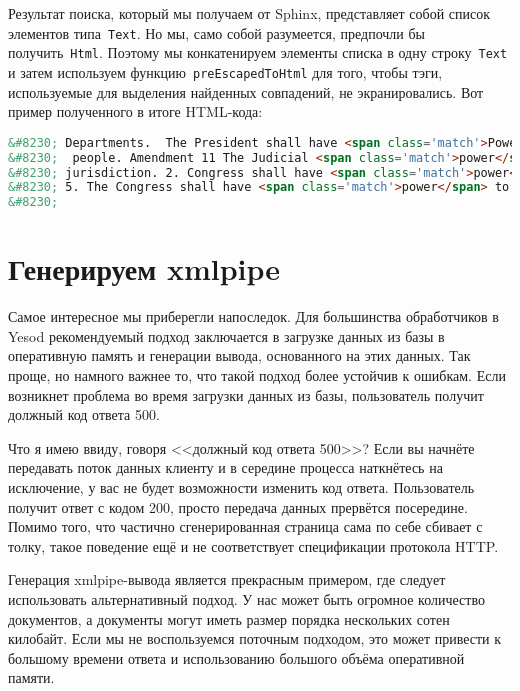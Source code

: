Результат поиска, который мы получаем от Sphinx, представляет собой список
элементов типа~\lstinline'Text'. Но мы, само собой разумеется, предпочли бы
получить~\lstinline'Html'. Поэтому мы конкатенируем элементы списка в одну
строку~\lstinline'Text' и затем используем функцию~\lstinline'preEscapedToHtml'
для того, чтобы тэги, используемые для выделения найденных совпадений, не
экранировались. Вот пример полученного в итоге HTML-кода:
\begin{lstlisting}[language=HTML]
&#8230; Departments.  The President shall have <span class='match'>Power</span> to fill up all Vacancies
&#8230;  people. Amendment 11 The Judicial <span class='match'>power</span> of the United States shall
&#8230; jurisdiction. 2. Congress shall have <span class='match'>power</span> to enforce this article by
&#8230; 5. The Congress shall have <span class='match'>power</span> to enforce, by appropriate legislation
&#8230;
\end{lstlisting}

\section{Генерируем xmlpipe}
Самое интересное мы приберегли напоследок. Для большинства обработчиков в Yesod
рекомендуемый подход заключается в загрузке данных из базы в оперативную память
и генерации вывода, основанного на этих данных. Так проще, но намного важнее
то, что такой подход более устойчив к ошибкам. Если возникнет проблема во время
загрузки данных из базы, пользователь получит должный код ответа 500.

\begin{remark}
    Что я имею ввиду, говоря <<должный код ответа 500>>? Если вы начнёте
    передавать поток данных клиенту и в середине процесса наткнётесь на
    исключение, у вас не будет возможности изменить код ответа. Пользователь
    получит ответ с кодом 200, просто передача данных прервётся посередине.
    Помимо того, что частично сгенерированная страница сама по себе сбивает с
    толку, такое поведение ещё и не соответствует спецификации протокола HTTP.
\end{remark}

Генерация xmlpipe-вывода является прекрасным примером, где следует использовать
альтернативный подход. У нас может быть огромное количество документов, а
документы могут иметь размер порядка нескольких сотен килобайт. Если мы не
воспользуемся поточным подходом, это может привести к большому времени ответа и
использованию большого объёма оперативной памяти.


